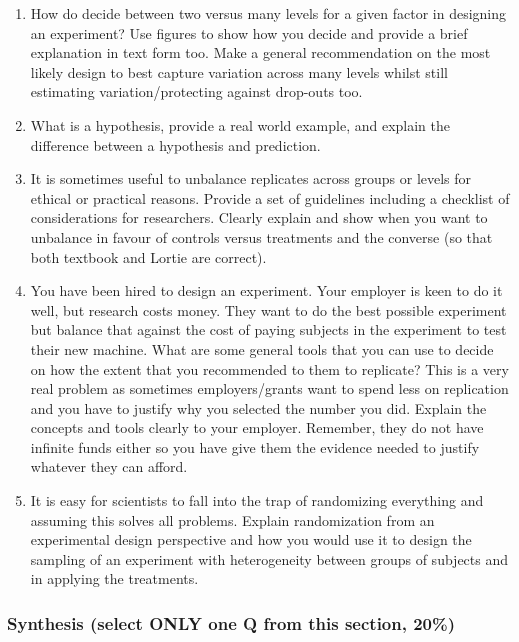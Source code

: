 \documentclass[
]{book}
\providecommand{\tightlist}{%
  \setlength{\itemsep}{0pt}\setlength{\parskip}{0pt}}
\begin{document}
\begin{enumerate}
\def\labelenumi{\arabic{enumi}.}
\tightlist
\item
  How do decide between two versus many levels for a given factor in designing an experiment? Use figures to show how you decide and provide a brief explanation in text form too. Make a general recommendation on the most likely design to best capture variation across many levels whilst still estimating variation/protecting against drop-outs too.\\
\item
  What is a hypothesis, provide a real world example, and explain the difference between a hypothesis and prediction.\\
\item
  It is sometimes useful to unbalance replicates across groups or levels for ethical or practical reasons. Provide a set of guidelines including a checklist of considerations for researchers. Clearly explain and show when you want to unbalance in favour of controls versus treatments and the converse (so that both textbook and Lortie are correct).\\
\item
  You have been hired to design an experiment. Your employer is keen to do it well, but research costs money. They want to do the best possible experiment but balance that against the cost of paying subjects in the experiment to test their new machine. What are some general tools that you can use to decide on how the extent that you recommended to them to replicate? This is a very real problem as sometimes employers/grants want to spend less on replication and you have to justify why you selected the number you did. Explain the concepts and tools clearly to your employer. Remember, they do not have infinite funds either so you have give them the evidence needed to justify whatever they can afford.\\
\item
  It is easy for scientists to fall into the trap of randomizing everything and assuming this solves all problems. Explain randomization from an experimental design perspective and how you would use it to design the sampling of an experiment with heterogeneity between groups of subjects and in applying the treatments.
\end{enumerate}

\hypertarget{synthesis-select-only-one-q-from-this-section-20}{%
\subsubsection*{Synthesis (select ONLY one Q from this section, 20\%)}\label{synthesis-select-only-one-q-from-this-section-20}}
\end{document}
